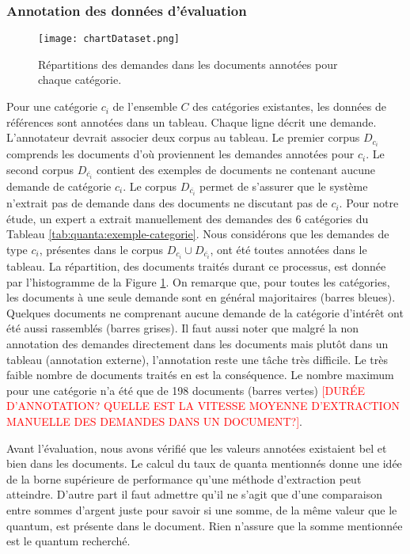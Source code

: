 \subsubsection{Annotation des données d'évaluation}
\begin{figure}[h!]
	\texttt{[image: chartDataset.png]}
	\caption{Répartitions des demandes dans les documents annotées pour chaque catégorie.}\label{fig:quanta:hist-repartition-docs}
\end{figure}
Pour une catégorie $c_i$ de l'ensemble $C$ des catégories existantes, les données de références sont annotées dans un tableau. Chaque ligne décrit une demande. L'annotateur devrait associer deux corpus au tableau. Le premier corpus $D_{c_i}$ comprends les documents d'où proviennent les demandes annotées pour $c_i$. Le second corpus $D_{\overline{c_i}}$ contient des exemples de documents ne contenant aucune demande de catégorie $c_i$. Le corpus $D_{\overline{c_i}}$ permet de s'assurer que le système n'extrait pas de demande dans des documents ne discutant pas de $c_i$.  Pour notre étude, un expert a extrait manuellement des demandes des 6 catégories du Tableau \ref{tab:quanta:exemple-categorie}. Nous considérons que les demandes de type $c_i$, présentes dans le corpus $D_{c_i} \cup D_{\overline{c_i}}$, ont été toutes annotées dans le tableau. La répartition, des documents traités durant ce processus, est donnée par l'histogramme de la Figure \ref{fig:quanta:hist-repartition-docs}.  On remarque que, pour toutes les catégories, les documents à une seule demande sont en général majoritaires (barres bleues). Quelques documents ne comprenant aucune demande de la catégorie d'intérêt ont été aussi rassemblés (barres grises). Il faut aussi noter que malgré la non annotation des demandes directement dans les documents mais plutôt dans un tableau (annotation externe), l'annotation reste une tâche très difficile. Le très faible nombre de documents traités en est la conséquence. Le nombre  maximum pour une catégorie n'a été que de 198 documents (barres vertes) \textcolor{red}{[DURÉE D'ANNOTATION? QUELLE EST LA VITESSE MOYENNE D'EXTRACTION MANUELLE DES DEMANDES DANS UN DOCUMENT?]}.


Avant l'évaluation, nous avons vérifié que les valeurs annotées existaient bel et bien dans les documents. Le calcul du taux de quanta mentionnés donne une idée de la borne supérieure de performance qu'une méthode d'extraction peut atteindre. D'autre part il faut admettre qu'il ne s'agit que d'une comparaison entre sommes d'argent juste pour savoir si une somme, de la même valeur que le quantum, est présente dans le document. Rien n'assure que la somme mentionnée est le quantum recherché.

